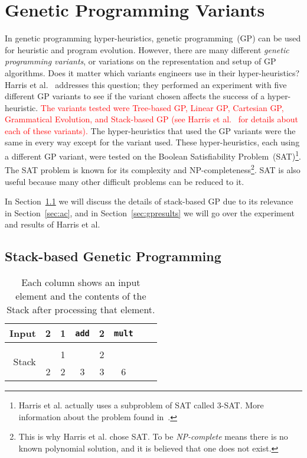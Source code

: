 \documentclass{sig-alternate}
\begin{document}
\section{Genetic Programming Variants}
\label{sec:gpvariants}
In genetic programming hyper-heuristics, genetic programming~(GP) can be used for heuristic and program evolution. However, there are many different \textit{genetic programming variants}, or variations on the representation and setup of GP algorithms. Does it matter which variants engineers use in their hyper-heuristics? Harris et al.~\cite{harris:2015} addresses this question; they performed an experiment with five different GP variants to see if the variant chosen affects the success of a hyper-heuristic. \textcolor{red}{The variants tested were Tree-based GP, Linear GP, Cartesian GP, Grammatical Evolution, and Stack-based GP (see Harris et al.~\cite{harris:2015} for details about each of these variants).}  The hyper-heuristics that used the GP variants were the same in every way except for the variant used. These hyper-heuristics, each using a different GP variant, were tested on the Boolean Satisfiability Problem~(SAT)\footnote{Harris et al. actually uses a subproblem of SAT called 3-SAT. More information about the problem found in~\cite{harris:2015}.}. 
The SAT problem is known for its complexity and NP-compl\-eteness\footnote{This is why Harris et al. chose SAT. To be \textit{NP-complete} means there is no known polynomial solution, and it is believed that one does not exist.}. SAT is also useful because many other difficult problems can be reduced to it. 

In Section~\ref{sec:sgp} we will discuss the details of stack-based GP due to its relevance in Section~\ref{sec:ac}, and in Section~\ref{sec:gpresults} we will go over the experiment and results of Harris et al.

\subsection{Stack-based Genetic Programming}
\label{sec:sgp}
\begin{table}
	\centering
	\begin{tabular}{|r|c|c|c|c|c|c|c|}
		\hline
		Input & 2 & 1 & \texttt{add} & 2 & \texttt{mult} \\
		\hline
		\multirow{3}{*}{Stack} & & & & &\\
		&   & 1 &   & 2 &   \\
		& 2 & 2 & 3 & 3 & 6 \\
		\hline
	\end{tabular}
	\caption{Each column shows an input element and the contents of the Stack after processing that element.}
	\label{tab:stacks}
\end{table}
\end{document}

